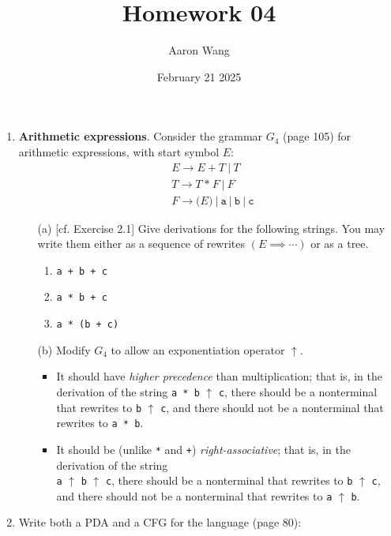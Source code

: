 \documentclass{article}
\title{Homework 04}
\author{Aaron Wang}
\date{February 21 2025}
\newcommand{\str}{\texttt}
\begin{document}
\maketitle
\begin{enumerate}
    \item \textbf{Arithmetic expressions}. Consider the grammar $G_4$ (page 105) for arithmetic expressions, with start symbol $E$:
    \begin{align*}
        & E \rightarrow E \: \str{+} \: T \: | \: T\\
        & T \rightarrow T \: \str{*} \: F \: | \: F\\
        & F \rightarrow \str{(}E\str{)} \: | \: \str{a} \: | \: \str{b} \: | \: \str{c}
    \end{align*}
    \begin{enumerate}
        \item [(a)][cf. Exercise 2.1] Give derivations for the following strings. You may write them either as a sequence of rewrites $(E \implies \cdots)$ or as a tree.
        \begin{enumerate}
            \item \str{a + b + c}
            \item \str{a * b + c}
            \item \str{a * (b + c)}
        \end{enumerate}
        
        \item [(b)]Modify $G_4$ to allow an exponentiation operator $\uparrow$.
        \begin{itemize}
            \item It should have \textit{higher precedence} than multiplication; that is, in the derivation of the string \str{a * b} $\uparrow$ \str{c}, there should be a nonterminal that rewrites to \str{b} $\uparrow$ \str{c}, and there should not be a nonterminal that rewrites to \str{a * b}.
            \item It should be (unlike \str{*} and \str{+}) \textit{right-associative}; that is, in the derivation of the string\\ \str{a} $\uparrow$ \str{b} $\uparrow$ \str{c}, there should be a nonterminal that rewrites to \str{b} $\uparrow$ \str{c}, and there should not be a nonterminal that rewrites to \str{a} $\uparrow$ \str{b}.
        \end{itemize}
        
    \end{enumerate}
    \item Write both a PDA and a CFG for the language (page 80):

\end{enumerate}
\end{document}
